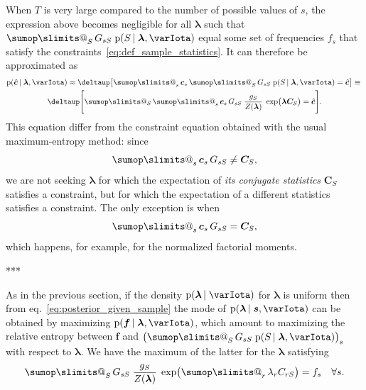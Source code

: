 \documentclass[\ifafour a4paper,12pt,\else a5paper,10pt,\fi%
onecolumn,oneside,article,%
british%
]{memoir}
\makeatletter
\theoremstyle{remark}
\theoremstyle{innote}
\def\sum{\DOTSI\sumop\slimits@}
\newcommand*{\delt}{\deltaup}%
\newcommand*{\pf}{\mathrm{p}}%
\renewcommand*{\|}{\nonscript\,\vert\nonscript\;\mathopen{}}
\newcommand*{\eqn}{eq.}%
\newcommand*{\tsum}{\mathop{\textstyle\sum}\nolimits}
\newcommand*{\yS}{S}
\newcommand*{\ys}{s}
\newcommand*{\yst}{\bm{\ys}}
\newcommand*{\yll}{\lambda}
\newcommand*{\yl}{\bm{\lambda}}
\newcommand*{\yg}{g}
\newcommand*{\yI}{\varIota}
\newcommand*{\yf}{\bm{f}}
\newcommand*{\ycs}{\bm{c}}
\newcommand*{\yccs}{\Hat{\bm{c}}}
\makeatother
\begin{document}
When $T$ is very large compared to the number of possible values of $\ys$,
the expression above becomes negligible for all $\yl$ such that
$\tsum_{\yS} G_{\ys\yS}\;\pf(\yS \| \yl, \yI)$ equal some set of frequencies
$f_{\ys}$ that satisfy the constraints~\eqref{eq:def_sample_statistics}. It
can therefore be approximated as
\begin{multline}
  \label{eq:posterior_given_statistics_approx_delta}
  \pf(\yccs \| \yl, \yI) \approx
  \delt\bigl[\tsum_{\ys} \ycs_{\ys}
  \tsum_{\yS} G_{\ys\yS}\;\pf(\yS \| \yl, \yI) = \yccs \bigr]
  \equiv{}\\
  \delt\Biggl[
  \sum_{\yS} \tsum_{\ys}\ycs_{\ys}\,G_{\ys\yS}\;
  \frac{\yg_{\yS}}{Z(\yl)}\;\exp\bigl(\yl \bm{C}_{\yS}\bigr)
  = \yccs \Biggr].
\end{multline}
This equation differ from the constraint equation obtained with the usual
maximum-entropy method: since
\begin{equation}
  \label{eq:diff_constr_sample_full}
  \tsum_{\ys} \ycs_{\ys}\,G_{\ys\yS} \ne \bm{C}_{\yS},
\end{equation}
we are not seeking $\yl$ for which the expectation of \emph{its conjugate
  statistics} $\bm{C}_{\yS}$ satisfies a constraint, but for which the
expectation of a different statistics satisfies a constraint. The only
exception is when 
\begin{equation}
  \label{eq:equal_constr_sample_full}
  \tsum_{\ys} \ycs_{\ys}\,G_{\ys\yS} = \bm{C}_{\yS},
\end{equation}
which happens, for example, for the normalized factorial moments.



***






As in the previous section, if the density $\pf(\yl \| \yI)$ for $\yl$ is
uniform then from \eqn~\eqref{eq:posterior_given_sample} the mode of
$\pf(\yl \| \yst, \yI)$ can be obtained by maximizing
$\pf(\yf \| \yl, \yI)$, which amount to maximizing the relative entropy
between $\yf$ and $\bigl(\tsum_{\yS} G_{\ys\yS}\;\pf(\yS \| \yl,
\yI)\bigr)_{\ys}$ with respect to $\yl$. We have the maximum of the latter
for the $\yl$ satisfying
\begin{equation}
  \label{eq:lambda_condition}
  \tsum_{\yS} G_{\ys\yS}\;
  \frac{\yg_{\yS}}{Z(\yl)}\;\exp\bigl(\tsum_{r} \yll_r C_{r\yS}\bigr)
=  f_{\ys} \quad\forall \ys.
\end{equation}
\end{document}
